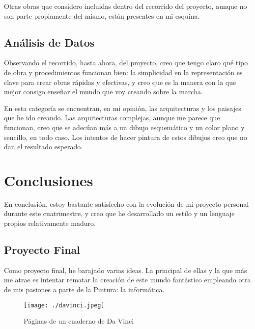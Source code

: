 \documentclass[twoside,twocolumn]{article}
\begin{document}
Otras obras que considero incluidas dentro del recorrido del proyecto,
aunque no son parte propiamente del mismo, están presentes en mi
esquina.

\hypertarget{anuxe1lisis-de-datos}{%
\subsection{Análisis de Datos}\label{anuxe1lisis-de-datos}}

Observando el recorrido, hasta ahora, del proyecto, creo que tengo claro
qué tipo de obra y procedimientos funcionan bien: la simplicidad en la
representación es clave para crear obras rápidas y efectivas, y creo que
es la manera con la que mejor consigo enseñar el mundo que voy creando
sobre la marcha.

En esta categoría se encuentran, en mi opinión, las arquitecturas y los
paisajes que he ido creando. Las arquitecturas complejas, aunque me
parece que funcionan, creo que se adecúan más a un dibujo esquemático y
un color plano y sencillo, en todo caso. Los intentos de hacer pintura
de estos dibujos creo que no dan el resultado esperado.

\clearpage

\hypertarget{conclusiones}{%
\section{Conclusiones}\label{conclusiones}}

En conclusión, estoy bastante satisfecho con la evolución de mi proyecto
personal durante este cuatrimestre, y creo que he desarrollado un estilo
y un lenguaje propios relativamente maduro.

\hypertarget{proyecto-final}{%
\subsection{Proyecto Final}\label{proyecto-final}}

Como proyecto final, he barajado varias ideas. La principal de ellas y
la que más me atrae es intentar rematar la creación de este mundo
fantástico empleando otra de mis pasiones a parte de la Pintura: la
informática.

\begin{figure}
  \centering
  \texttt{[image: ./davinci.jpeg]}
  \caption{Páginas de un cuaderno de Da Vinci}
\end{figure}
\end{document}
